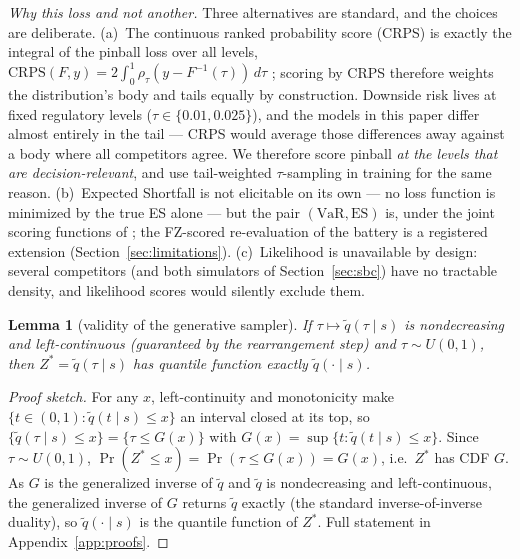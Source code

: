 \documentclass[11pt]{article}
\newcommand{\VaR}{\mathrm{VaR}}
\newcommand{\ES}{\mathrm{ES}}
\newtheorem{lemma}{Lemma}
\theoremstyle{remark}
\begin{document}
\emph{Why this loss and not another.} Three alternatives are standard,
and the choices are deliberate. (a)~The continuous ranked probability
score (CRPS) is exactly the integral of the pinball loss over all
levels, $\mathrm{CRPS}(F,y) = 2\int_0^1 \rho_\tau(y - F^{-1}(\tau))\,
d\tau$ \citep{gneitingraftery2007}; scoring by CRPS therefore weights
the distribution's body and tails equally by construction. Downside
risk lives at fixed regulatory levels ($\tau \in \{0.01, 0.025\}$), and
the models in this paper differ almost entirely in the tail --- CRPS
would average those differences away against a body where all
competitors agree. We therefore score pinball \emph{at the levels that
are decision-relevant}, and use tail-weighted $\tau$-sampling in
training for the same reason. (b)~Expected Shortfall is not elicitable
on its own --- no loss function is minimized by the true ES alone ---
but the pair $(\VaR,\ES)$ is, under the joint scoring functions of
\citet{fissler2016}; the FZ-scored re-evaluation of the battery is a
registered extension (Section~\ref{sec:limitations}). (c)~Likelihood is
unavailable by design: several competitors (and both simulators of
Section~\ref{sec:sbc}) have no tractable density, and likelihood scores
would silently exclude them.


\begin{lemma}[validity of the generative sampler]\label{lem:sampler}
If $\tau \mapsto \widetilde{q}(\tau \mid s)$ is nondecreasing and
left-continuous (guaranteed by the rearrangement step) and
$\tau \sim U(0,1)$, then $Z^* = \widetilde{q}(\tau \mid s)$ has
quantile function exactly $\widetilde{q}(\cdot \mid s)$.
\end{lemma}
\begin{proof}[Proof sketch]
For any $x$, left-continuity and monotonicity make
$\{t\in(0,1):\widetilde{q}(t\mid s)\le x\}$ an interval closed at its
top, so $\{\widetilde q(\tau\mid s)\le x\}=\{\tau\le G(x)\}$ with
$G(x)=\sup\{t:\widetilde q(t\mid s)\le x\}$. Since $\tau\sim U(0,1)$,
$\Pr(Z^*\le x)=\Pr(\tau\le G(x))=G(x)$, i.e.\ $Z^*$ has CDF $G$. As $G$
is the generalized inverse of $\widetilde q$ and $\widetilde q$ is
nondecreasing and left-continuous, the generalized inverse of $G$
returns $\widetilde q$ exactly (the standard inverse-of-inverse
duality), so $\widetilde q(\cdot\mid s)$ is the quantile function of
$Z^*$. Full statement in Appendix~\ref{app:proofs}.
\end{proof}
\end{document}
